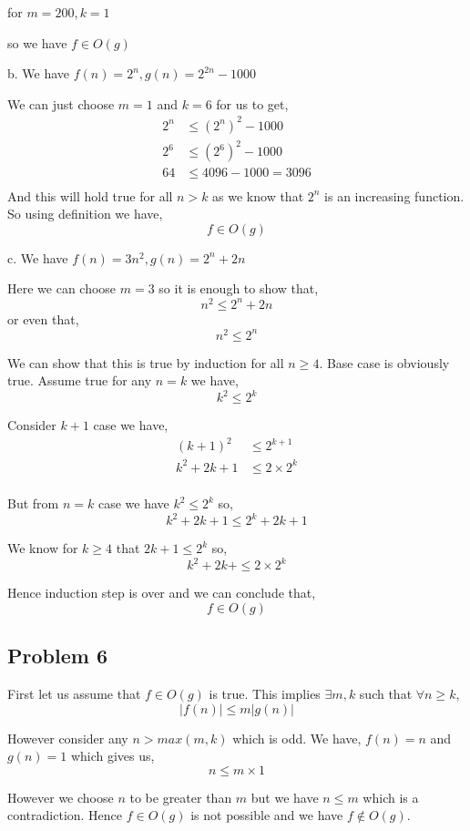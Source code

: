 \documentclass[a4paper]{report}
\begin{document}
for $m = 200, k = 1$

so we have  $f \in O(g)$


b. We have $f(n) = 2^{n}, g(n) = 2^{2n} - 1000$

We can just choose $m = 1$ and $k = 6$ for us to get,  
\begin{align*}
    2^{n} &\le (2^{n})^2 - 1000\\
    2^{6} &\le (2^{6})^2 - 1000\\
    64 &\le 4096 - 1000 = 3096\\
\end{align*}
And this will hold true for all $n > k$ as we know that  $2^{n}$ is an increasing function. So using definition we have, 
$$ f \in O(g) $$ 


c. We have $f(n) = 3n^2, g(n) = 2^{n} + 2n$

Here we can choose $m = 3$ so it is enough to show that, 
$$ n^2 \le  2^{n} + 2n $$  or even that, 
$$ n^2 \le 2^{n} $$ 

We can show that this is true by induction for all $n \ge 4$. Base case is obviously true. Assume true for any  $n =k$ we have,  
$$ k^2 \le 2^{k} $$ 

Consider $k + 1$ case we have,  
\begin{align*}
    (k + 1)^2 &\le 2^{k + 1}\\
    k^2 + 2k + 1 &\le 2 \times  2^{k}\\
\end{align*}

But from $n = k$ case we have $k^2 \le 2^{k}$ so, 
$$ k^2 + 2k + 1 \le 2^{k} + 2k + 1 $$ 

We know for $k \ge 4$ that  $2k + 1 \le 2^{k}$ so, 
$$ k^2 + 2k +  \le 2 \times  2^{k} $$ 

Hence induction step is over and we can conclude that, 
$$ f \in O(g) $$ 




\subsection*{Problem 6}
First let us assume that $f \in O(g)$ is true. This implies  $\exists m,k$ such that  $\forall n \ge k$,  
$$ |f(n)| \le m |g(n)| $$ 

However consider any $n > max(m, k)$ which is odd. We have,  $f(n) = n$ and  $g(n) = 1$ which gives us,  
$$ n \le m \times  1 $$ 

However we choose $n$ to be greater than $m$ but we have  $n \le m$ which is a contradiction. Hence  $f \in O(g)$ is not possible and we have $f \not \in O(g)$.
\end{document}
